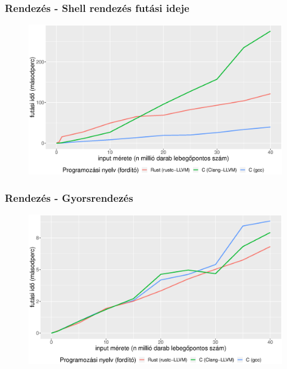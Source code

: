 \documentclass{beamer}
\begin{document}
\begin{frame}[fragile]
\frametitle{Rendezés - Shell rendezés futási ideje}

\begin{figure}[htb]
\begin{center}
	\includegraphics[scale=0.4]{images/shells_sort_run.eps}
\end{center}
\end{figure}

\end{frame}

\begin{frame}[fragile]
\frametitle{Rendezés - Gyorsrendezés}

\begin{figure}[htb]
\begin{center}
	\includegraphics[scale=0.4]{images/quicksort_run_without_read.eps}
\end{center}
\end{figure}

\end{frame}
\end{document}
